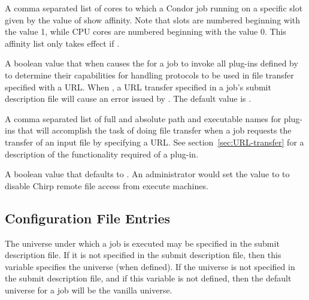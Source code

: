 \begin{description}
\label{param:SlotNCpuAffinity} 
\item[\Macro{SLOT<N>\_CPU\_AFFINITY}]
  A comma separated list of cores to which a Condor job running on
  a specific slot given by the value of  show affinity.
  Note that slots are numbered beginning with the value 1,
  while CPU cores are numbered beginning with the value 0.
  This affinity list only takes effect if
  .

\label{param:EnableURLTransfers} 
\item[\Macro{ENABLE\_URL\_TRANSFERS}]
  A boolean value that when  causes the  for
  a job to invoke all plug-ins defined by 
  to determine their capabilities for handling protocols to be
  used in file transfer specified with a URL.
  When , a URL transfer specified in a job's submit description
  file will cause an error issued by .
  The default value is .

\label{param:FiletransferPlugins} 
\item[\Macro{FILETRANSFER\_PLUGINS}]
  A comma separated list of full and absolute path and executable names
  for plug-ins that will accomplish the task of doing file transfer
  when a job requests the transfer of an input file by specifying a URL. 
  See section~\ref{sec:URL-transfer} for a description of the functionality
  required of a plug-in.

\label{param:EnableChirp} 
\item[\Macro{ENABLE\_CHIRP}]
  A boolean value that defaults to . An administrator
  would set the value to  to disable Chirp remote file access 
  from execute machines. 

\end{description}

\subsection{\label{sec:Submit-Config-File-Entries}
Configuration File Entries}

\begin{description}
\label{param:DefaultUniverse}
\item[\Macro{DEFAULT\_UNIVERSE}]
  The universe under which a job is executed may be specified in the submit
  description file.
  If it is not specified in the submit description file, then
  this variable specifies the universe (when defined).
  If the universe is not specified in the submit description
  file, and if this variable is not defined, then
  the default universe for a job will be the vanilla universe.
\end{description}

